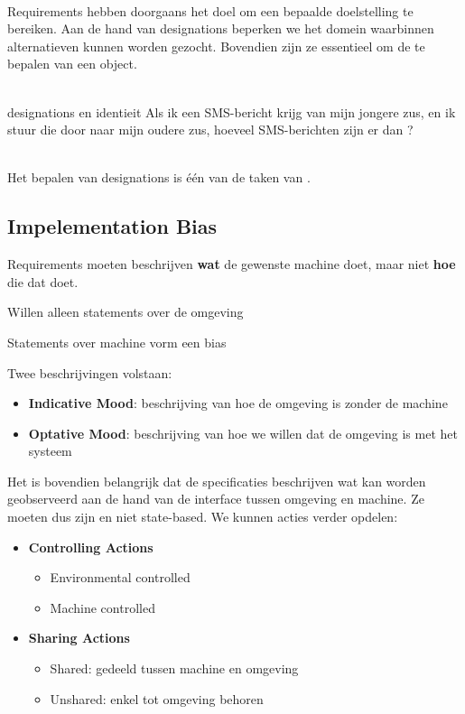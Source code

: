 \documentclass[../../main.tex]{subfiles}
\begin{document}
\\
Requirements hebben doorgaans het doel om een bepaalde doelstelling te bereiken. Aan de hand van designations beperken we het domein waarbinnen alternatieven kunnen worden gezocht. Bovendien zijn ze essentieel om de  te bepalen van een object.\\
\\
\begin{ex}{designations en identieit}
Als ik een SMS-bericht krijg van mijn jongere zus, en ik stuur die door naar mijn oudere zus, hoeveel SMS-berichten zijn er dan ?
\end{ex} \\
Het bepalen van designations is \'e\'en van de taken van .
\subsection{Impelementation Bias}
Requirements moeten beschrijven \textbf{wat} de gewenste machine doet, maar niet \textbf{hoe} die dat doet.
\begin{description}
	\item Willen alleen statements over de omgeving
	\item Statements over machine vorm een bias
\end{description}
Twee beschrijvingen volstaan:
\begin{itemize}
	\item \textbf{Indicative Mood}: beschrijving van hoe de omgeving is zonder de machine
	\item \textbf{Optative Mood}: beschrijving van hoe we willen dat de omgeving is met het systeem
\end{itemize}
Het is bovendien belangrijk dat de specificaties beschrijven wat kan worden geobserveerd aan de hand van de interface tussen omgeving en machine. Ze moeten dus  zijn en niet state-based. We kunnen acties verder opdelen:
\begin{itemize}
	\item \textbf{Controlling Actions}
	\begin{itemize}
		\item Environmental controlled
		\item Machine controlled
	\end{itemize}
	\item \textbf{Sharing Actions}
	\begin{itemize}
		\item Shared: gedeeld tussen machine en omgeving
		\item Unshared: enkel tot omgeving behoren
	\end{itemize}
\end{itemize}
\end{document}
